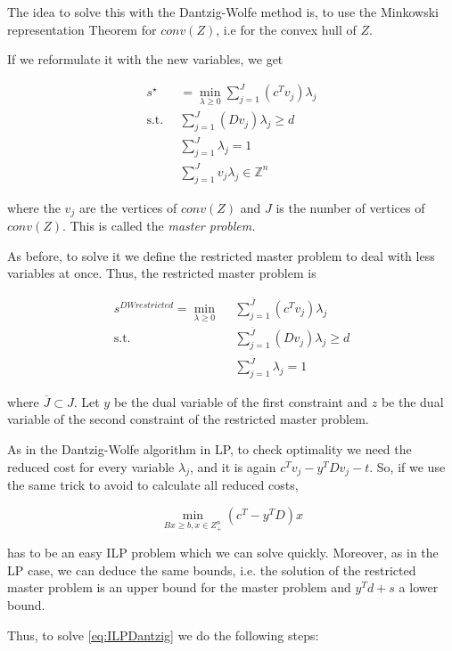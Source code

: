 \documentclass[a4paper,12pt]{article}
\begin{document}
The idea to solve this with the Dantzig-Wolfe method is, to use the Minkowski representation Theorem for $conv(Z)$, i.e for the convex hull of $Z$.

If we reformulate it with the new variables, we get

\begin{align*}
s^{\star} &= \min_{\lambda \geq 0} \sum_{j = 1}^J (c^Tv_j)\lambda_j \\
\text{s.t.} \enspace & \sum_{j = 1}^J (Dv_j)\lambda_j \geq d \\
&\sum_{j = 1}^J \lambda_j = 1 \\
&\sum_{j = 1}^J v_j \lambda_j \in \mathbb{Z}^n 
\end{align*}

where the $v_j$ are the vertices of $conv(Z)$ and $J$ is the number of vertices of $conv(Z)$. This is called the \textit{master problem.}

As before, to solve it we define the restricted master problem to deal with less variables at once. Thus, the restricted master problem is 

\begin{align*}
s^{DWrestricted} = \min_{\lambda \geq 0} \enspace & \sum_{j = 1}^{\overline{J}} (c^Tv_j)\lambda_j \\
\text{s.t.} \enspace & \sum_{j = 1}^{\overline{J}} (Dv_j)\lambda_j \geq d \\
&\sum_{j = 1}^{\overline{J}} \lambda_j = 1 
\end{align*}

where $\overline{J} \subset J$. Let $y$ be the dual variable of the first constraint and $z$ be the dual variable of the second constraint of the restricted master problem.

As in the Dantzig-Wolfe algorithm in LP, to check optimality we need the reduced cost for every variable $\lambda_j$, and it is again $c^T v_j - y^T Dv_j - t$. So, if we use the same trick to avoid to calculate all reduced costs, 

\begin{equation}
\min_{Bx\geq b,x\in Z^n_+} (c^T - y^TD)x
\label{eq:ILPsubproblem}
\end{equation}

has to be an easy ILP problem which we can solve quickly. Moreover, as in the LP case, we can deduce the same bounds, i.e. the solution of the restricted master problem is an upper bound for the master problem and $y^T d + s$ a lower bound.

Thus, to solve \eqref{eq:ILPDantzig} we do the following steps:
\end{document}
